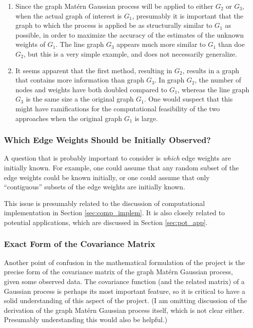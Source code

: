 \begin{enumerate}
    \item Since the graph Mat\'{e}rn Gaussian process will be applied to either $G_2$ or $G_3$, when the actual graph of interest is $G_1$, presumably it is important that the graph to which the process is applied be as structurally similar to $G_1$ as possible, in order to maximize the accuracy of the estimates of the unknown weights of $G_1$. The line graph $G_3$ appears much more similar to $G_1$ than doe $G_2$, but this is a very simple example, and does not necessarily generalize.
    \item It seems apparent that the first method, resulting in $G_2$, results in a graph that contains more information than graph $G_3$. In graph $G_2$, the number of nodes and weights have both doubled compared to $G_1$, whereas the line graph $G_3$ is the same size a the original graph $G_1$. One would suspect that this might have ramifications for the computational feasibility of the two approaches when the original graph $G_1$ is large.
\end{enumerate}


\subsubsection{Which Edge Weights Should be Initially Observed?}

A question that is probably important to consider is \textit{which} edge weights are initially known. For example, one could assume that any random subset of the edge weights could be known initially, or one could assume that only ``contiguous'' subsets of the edge weights are initially known.

This issue is presumably related to the discussion of computational implementation in Section \ref{sec:comp_implem}. It is also closely related to potential applications, which are discussed in Section \ref{sec:pot_app}.

\subsubsection{Exact Form of the Covariance Matrix}

Another point of confusion in the mathematical formulation of the project is the precise form of the covariance matrix of the graph Mat\'{e}rn Gaussian process, given some observed data. The covariance function (and the related matrix) of a Gaussian process is perhaps its most important feature, so it is critical to have a solid understanding of this aspect of the project. (I am omitting discussion of the derivation of the graph Mat\'{e}rn Gaussian process itself, which is not clear either. Presumably understanding this would also be helpful.)

